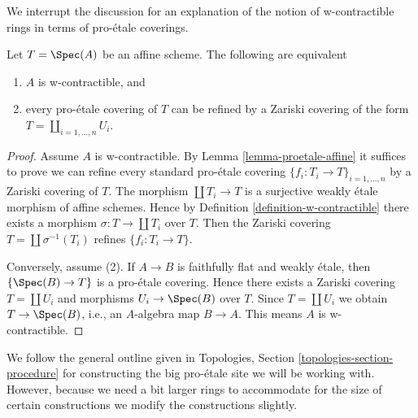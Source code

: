 \noindent
We interrupt the discussion for an explanation of the notion
of w-contractible rings in terms of pro-\'etale coverings.

\begin{lemma}
\label{lemma-w-contractible-proetale-cover}
Let $T = \Spec(A)$ be an affine scheme. The following are equivalent
\begin{enumerate}
\item $A$ is w-contractible, and
\item every pro-\'etale covering of $T$ can be refined by
a Zariski covering of the form $T = \coprod_{i = 1, \ldots, n} U_i$.
\end{enumerate}
\end{lemma}

\begin{proof}
Assume $A$ is w-contractible. By Lemma \ref{lemma-proetale-affine}
it suffices to prove we can refine every standard pro-\'etale covering
$\{f_i : T_i \to T\}_{i = 1, \ldots, n}$ by a Zariski covering of $T$.
The morphism $\coprod T_i \to T$ is a surjective weakly \'etale morphism
of affine schemes. Hence by Definition \ref{definition-w-contractible}
there exists a morphism $\sigma : T \to \coprod T_i$ over $T$.
Then the Zariski covering $T = \coprod \sigma^{-1}(T_i)$
refines $\{f_i : T_i \to T\}$.

\medskip\noindent
Conversely, assume (2). If $A \to B$ is faithfully flat and weakly \'etale,
then $\{\Spec(B) \to T\}$ is a pro-\'etale covering.
Hence there exists a Zariski covering $T = \coprod U_i$
and morphisms $U_i \to \Spec(B)$ over $T$. Since $T = \coprod U_i$
we obtain $T \to \Spec(B)$, i.e., an $A$-algebra map $B \to A$.
This means $A$ is w-contractible.
\end{proof}

\noindent
We follow the general outline given in
Topologies, Section \ref{topologies-section-procedure}
for constructing the big pro-\'etale site we will be working with.
However, because we need a bit larger rings to accommodate for the size
of certain constructions we modify the constructions slightly.

